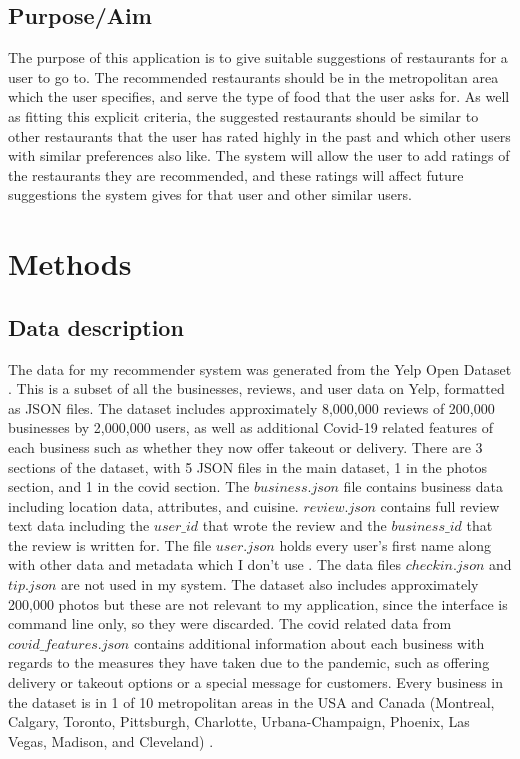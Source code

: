 \documentclass[conference]{IEEEtran}
\begin{document}
\subsection{Purpose/Aim}
The purpose of this application is to give suitable suggestions of restaurants for a user to go to. 
The recommended restaurants should be in the metropolitan area which the user specifies, and serve the 
type of food that the user asks for. 
As well as fitting this explicit criteria, the suggested restaurants should be similar to other restaurants 
that the user has rated highly in the past and which other users with similar preferences also like. 
The system will allow the user to add ratings of the restaurants they are recommended, and these ratings will 
affect future suggestions the system gives for that user and other similar users. 


\section{Methods}

\subsection{Data description}
The data for my recommender system was generated from the Yelp Open Dataset \cite{YelpDataset}. 
This is a subset of all the businesses, reviews, and user data on Yelp, formatted as JSON files. 
The dataset includes approximately 8,000,000 reviews of 200,000 businesses by 2,000,000 users, as well as 
additional Covid-19 related features of each business such as whether they now offer takeout or delivery. 
There are 3 sections of the dataset, with 5 JSON files in the main dataset, 1 in the photos section, and 
1 in the covid section. 
The $business.json$ file contains business data including location data, attributes, and cuisine. 
$review.json$ contains full review text data including the $user\_id$ that wrote the review and the $business\_id$ 
that the review is written for. 
The file $user.json$ holds every user's first name along with other data and metadata which I don't use \cite{YelpDataset}. 
The data files $checkin.json$ and $tip.json$ are not used in my system. 
The dataset also includes approximately 200,000 photos but these are not relevant to my application, since 
the interface is command line only, so they were discarded. 
The covid related data from $covid\_features.json$ contains additional information about each business with regards to 
the measures they have taken due to the pandemic, such as offering delivery or takeout options or a 
special message for customers. 
Every business in the dataset is in 1 of 10 metropolitan areas in the USA and Canada 
(Montreal, Calgary, Toronto, Pittsburgh, Charlotte, Urbana-Champaign, Phoenix, Las Vegas, Madison, and Cleveland) \cite{YelpDataset}. 
\end{document}
